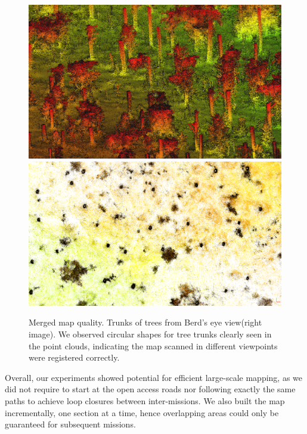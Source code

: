 \begin{figure}[htbp]
  \centering
  \includegraphics[width=0.49\columnwidth]{pics/exp_3_offline_pointclouds_trunk.png}
  \includegraphics[width=0.49\columnwidth]{pics/exp_3_offline_pointclouds_trunk_BV3.png}
  \caption{Merged map quality. Trunks of trees from Berd's eye view(right image). We observed circular shapes for tree trunks clearly seen in the point clouds, indicating the map scanned in different viewpoints were registered correctly.}
  \label{fig:truk_of_trees}
\end{figure}

Overall, our experiments showed potential for efficient large-scale mapping, as we did not require to start at the open access roads nor following exactly the same paths to achieve loop closures between inter-missions. We also built the map incrementally, one section at a time, hence overlapping areas could only be guaranteed for subsequent missions.






